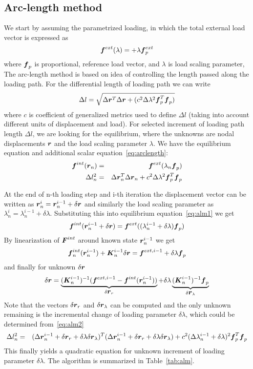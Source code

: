 \subsection{Arc-length method}
We start by assuming the parametrized loading, in which the total external load vector is expressed as 
$$\mbox{\boldmath$f$}^{ext}(\lambda) = +\lambda\mbox{\boldmath$f$}^{ext}_p$$
where $\mbox{\boldmath$f$}_p$ is proportional, reference load vector, and $\lambda$ is load scaling parameter, 
The arc-length method is based on idea of controlling the length passed along the loading path. For the differential length of loading  path we can write
\begin{equation}
  \Delta l = \sqrt{\Delta\mbox{\boldmath$r$}^T\Delta\mbox{\boldmath$r$}+(c^2\Delta\lambda^2\mbox{\boldmath$f$}^T_p\mbox{\boldmath$f$}_p)}
  \label{eq:arclength}
\end{equation}
where $c$ is coefficient of generalized metrics used to define $\Delta l$ (taking into account different units of displacement and load).
For selected increment of loading path length $\Delta l$, we are looking for the equilibrium, where the unknowns are nodal displacements $\mbox{\boldmath$r$}$ and the load scaling parameter $\lambda$. We have the equilibrium equation and additional scalar equation~\ref{eq:arclength}:
\begin{eqnarray}
  \label{eq:alm1}
  \mbox{\boldmath$f$}^{int}(\mbox{\boldmath$r$}_n) &=& \mbox{\boldmath$f$}^{ext}(\lambda_n\mbox{\boldmath$f$}_p)\\
  \label{eq:alm2}
  \Delta l_n^2&=&\Delta\mbox{\boldmath$r$}_n^T\Delta\mbox{\boldmath$r$}_n+c^2\Delta\lambda^2\mbox{\boldmath$f$}^T_p\mbox{\boldmath$f$}_p
\end{eqnarray}

At the end of n-th loading step and i-th iteration the displacement vector can be written as
$\mbox{\boldmath$r$}^i_n = \mbox{\boldmath$r$}^{i-1}_n+\delta\mbox{\boldmath$r$}$ and similarly the load scaling parameter as $\lambda_n^i = \lambda_n^{i-1}+\delta\lambda$. Substituting this into equilibrium equation~\ref{eq:alm1} we get
$$\mbox{\boldmath$f$}^{int}(\mbox{\boldmath$r$}_n^{i-1}+\delta\mbox{\boldmath$r$})=\mbox{\boldmath$f$}^{ext}((\lambda_n^{i-1}+\delta\lambda)\mbox{\boldmath$f$}_p)$$
By linearization of $\mbox{\boldmath$F$}^{int}$ around known state $\mbox{\boldmath$r$}_n^{i-1}$ we get
$$\mbox{\boldmath$f$}^{int}_n(\mbox{\boldmath$r$}_n^{i-1})+\mbox{\boldmath$K$}_n^{i-1}\delta\mbox{\boldmath$r$} = \mbox{\boldmath$f$}^{ext,i-1}+\delta\lambda\mbox{\boldmath$f$}_p$$
and finally for unknown $\delta\mbox{\boldmath$r$}$
\begin{equation}
  \delta\mbox{\boldmath$r$} = \underbrace{(\mbox{\boldmath$K$}_n^{i-1})^{-1}(\mbox{\boldmath$f$}^{ext,i-1}-\mbox{\boldmath$f$}^{int}(\mbox{\boldmath$r$}_n^{i-1}))}_{\delta\mbox{\boldmath$r$}_r} + \delta\lambda\underbrace{(\mbox{\boldmath$K$}_n^{i-1})^{-1}\mbox{\boldmath$f$}_p}_{\delta\mbox{\boldmath$r$}_\lambda}
\end{equation}
Note that the vectors $\delta\mbox{\boldmath$r$}_r$ and $\delta\mbox{\boldmath$r$}_\lambda$ can be computed and the only unknown remaining is the incremental change of loading parameter $\delta\lambda$, which could be determined from~\ref{eq:alm2}
\begin{eqnarray}
  \Delta l_n^2&=&(\Delta\mbox{\boldmath$r$}_n^{i-1}+\delta\mbox{\boldmath$r$}_r+\delta\lambda\delta\mbox{\boldmath$r$}_\lambda)^T(\Delta\mbox{\boldmath$r$}_n^{i-1}+\delta\mbox{\boldmath$r$}_r+\delta\lambda\delta\mbox{\boldmath$r$}_\lambda) + c^2(\Delta\lambda_n^{i-1}+\delta\lambda)^2\mbox{\boldmath$f$}^T_p\mbox{\boldmath$f$}_p
  \label{eq:quadraticlambda}
\end{eqnarray}
This finally yields a quadratic equation for unknown increment of loading parameter $\delta\lambda$. The algorithm is summarized in Table~\ref{tab:alm}.

